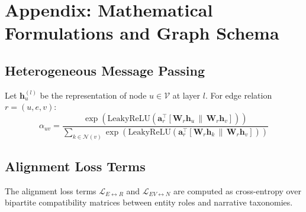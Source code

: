 \documentclass[11pt,a4paper]{article}
\begin{document}



\appendix
\section{Appendix: Mathematical Formulations and Graph Schema}
\subsection{Heterogeneous Message Passing}
Let $\mathbf{h}_u^{(l)}$ be the representation of node $u \in \mathcal{V}$ at layer $l$. For edge relation $r = (u, e, v)$:
\begin{equation}
\alpha_{uv} = \frac{\exp(\text{LeakyReLU}(\mathbf{a}_r^\top [\mathbf{W}_r \mathbf{h}_u \,\|\, \mathbf{W}_r \mathbf{h}_v]))}{\sum_{k \in \mathcal{N}(v)} \exp(\text{LeakyReLU}(\mathbf{a}_r^\top [\mathbf{W}_r \mathbf{h}_k \,\|\, \mathbf{W}_r \mathbf{h}_v]))}
\end{equation}
\subsection{Alignment Loss Terms}
The alignment loss terms $\mathcal{L}_{E \leftrightarrow R}$ and $\mathcal{L}_{EV \leftrightarrow N}$ are computed as cross-entropy over bipartite compatibility matrices between entity roles and narrative taxonomies.
\end{document}
